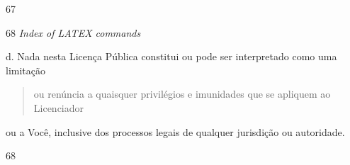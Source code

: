 \documentclass[
]{article}
\begin{document}
67

68 \emph{Index of LATEX commands}

d. Nada nesta Licença Pública constitui ou pode ser interpretado como
uma limitação

\begin{quote}
ou renúncia a quaisquer privilégios e imunidades que se apliquem ao
Licenciador
\end{quote}

ou a Você, inclusive dos processos legais de qualquer jurisdição ou
autoridade.

68
\end{document}
